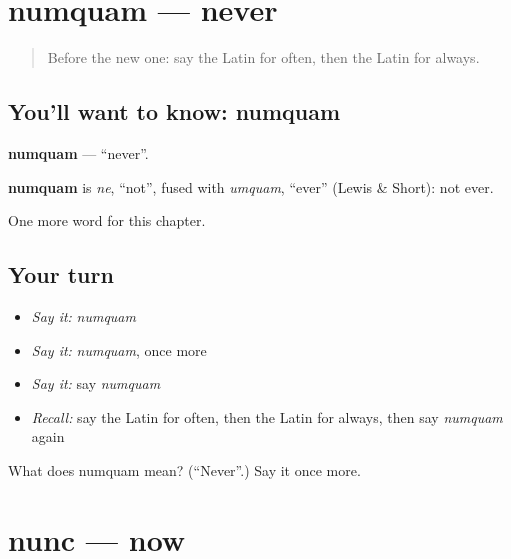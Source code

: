\section[numquam]{numquam — never}

\label{lesson:LA-C104-numquam}



\begin{quote}
Before the new one: say the Latin for often, then the Latin for always.
\end{quote}

\subsection*{You'll want to know: numquam}
\textbf{numquam} — \textquotedblleft{}never\textquotedblright{}.

\begin{cousinweb}
\textbf{numquam} is \emph{ne}, \textquotedblleft{}not\textquotedblright{}, fused with \emph{umquam}, \textquotedblleft{}ever\textquotedblright{} (Lewis \& Short): not ever.
\end{cousinweb}

\begin{grammarlens}[title={What you've built}]
One more word for this chapter.
\end{grammarlens}

\subsection*{Your turn}
\begin{itemize}
\raggedright
  \item \emph{Say it:} \emph{numquam}
  \item \emph{Say it:} \emph{numquam}, once more
  \item \emph{Say it:} say \emph{numquam}
  \item \emph{Recall:} say the Latin for often, then the Latin for always, then say \emph{numquam} again
\end{itemize}

\begin{tcolorbox}[breakable,colback=teal!4,colframe=teal!35!black,title={Before you move on}]
What does numquam mean? (\textquotedblleft{}Never\textquotedblright{}.) Say it once more.
\end{tcolorbox}
\section[nunc]{nunc — now}

